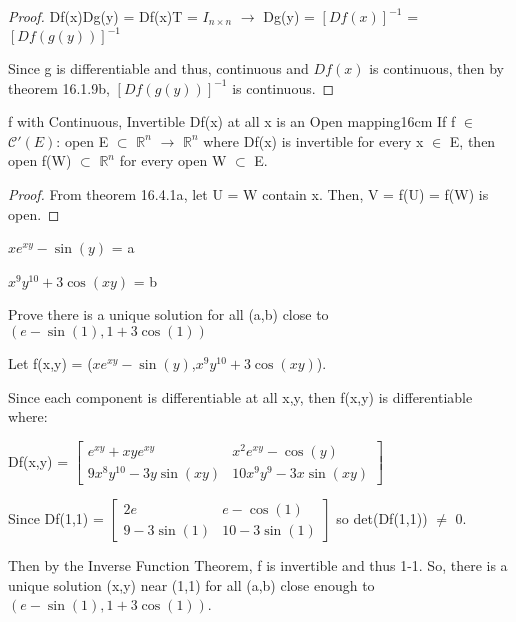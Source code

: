 \begin{proof}
        \hspace{0.5cm}
        Df(x)Dg(y) = Df(x)T = $I_{n \times n}$
        \hspace{0.5cm}
        $\rightarrow$
        \hspace{0.5cm}
        Dg(y) = $[Df(x)]^{-1}$
        = $[Df(g(y))]^{-1}$

        Since g is differentiable and thus, continuous and $Df(x)$
        is continuous, then by {\color{red} theorem 16.1.9b},
        $[Df(g(y))]^{-1}$ is continuous.
    \end{proof}

    \vspace{0.5cm}



    \begin{corollary}{f with Continuous, Invertible Df(x) at all x is
    an Open mapping}{16cm}
        If f $\in$ $\mathscr{C}'(E)$: open E $\subset$ $\mathbb{R}^n$
        $\rightarrow$ $\mathbb{R}^n$ where Df(x) is invertible for every x
        $\in$ E, then open f(W) $\subset$ $\mathbb{R}^n$ for
        every open W $\subset$ E.
    \end{corollary}

    \begin{proof}
        From {\color{red} theorem 16.4.1a}, let U = W contain x.
        Then, V = f(U) = f(W) is open.
    \end{proof}

    \newpage



    \begin{example}
        $xe^{xy} - \sin(y)$ = a

        $x^9 y^{10} + 3\cos(xy)$ = b

        Prove there is a unique solution for all (a,b)
        close to $(e-\sin(1),1+3\cos(1))$
    \end{example}

    \begin{tbox}
        Let f(x,y) = ($xe^{xy} - \sin(y)$,$x^9 y^{10} + 3\cos(xy)$).

        Since each component is differentiable at all x,y, then
        f(x,y) is differentiable where:

        \hspace{0.5cm}
        Df(x,y) =
        $\begin{bmatrix}
            e^{xy} + xye^{xy} & x^2e^{xy} - \cos(y) \\
            9x^8y^{10} - 3y\sin(xy) & 10x^9y^9 - 3x \sin(xy)
        \end{bmatrix}$

        Since Df(1,1) =
        $\begin{bmatrix}
            2e & e - \cos(1) \\
            9 - 3\sin(1) & 10 - 3\sin(1)
        \end{bmatrix}$
        so det(Df(1,1)) $\not =$ 0.

        Then by the Inverse Function Theorem, f is invertible
        and thus 1-1. So, there is a unique solution (x,y)
        near (1,1) for all (a,b)
        close enough to $(e-\sin(1),1+3\cos(1))$.
    \end{tbox}

